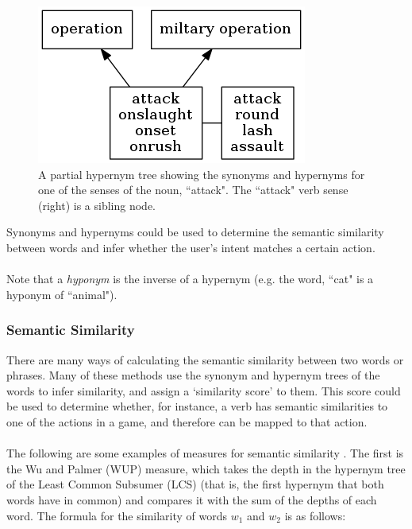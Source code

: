 \documentclass[11pt]{article}
\begin{document}
\begin{center}
\begin{figure}[H]
\begin{center}
  \includegraphics[scale=1]{hypernym-tree.png}
  \caption{A partial hypernym tree showing the synonyms and hypernyms for one of the senses of the noun, ``attack". The ``attack" verb sense (right) is a sibling node.}
  \end{center}
\end{figure}
\end{center}

Synonyms and hypernyms could be used to determine the semantic similarity between words and infer whether the user's intent matches a certain action.
\\
\\
Note that a \textit{hyponym} is the inverse of a hypernym (e.g. the word, ``cat" is a hyponym of ``animal").

\subsubsection{Semantic Similarity}
\label{section:bg-semantic-sim}

There are many ways of calculating the semantic similarity between two words or phrases. Many of these methods use the synonym and hypernym trees of the words to infer similarity, and assign a `similarity score' to them. This score could be used to determine whether, for instance, a verb has semantic similarities to one of the actions in a game, and therefore can be mapped to that action.
\\
\\
The following are some examples of measures for semantic similarity \cite{RefWorks:46}. The first is the Wu and Palmer (WUP) measure, which takes the depth in the hypernym tree of the Least Common Subsumer (LCS) (that is, the first hypernym that both words have in common) and compares it with the sum of the depths of each word. The formula for the similarity of words $w_1$ and $w_2$ is as follows:
\end{document}
